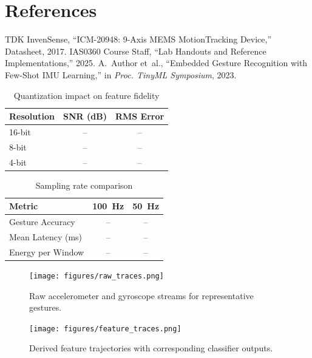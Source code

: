 \documentclass[conference]{IEEEtran}
\begin{document}
\section*{References}
\begin{thebibliography}{1}
 TDK InvenSense, ``ICM-20948: 9-Axis MEMS MotionTracking Device,'' Datasheet, 2017.
 IAS0360 Course Staff, ``Lab Handouts and Reference Implementations,'' 2025.
 A.~Author et~al., ``Embedded Gesture Recognition with Few-Shot IMU Learning,'' in \emph{Proc. TinyML Symposium}, 2023.
\end{thebibliography}

\begin{table}[!t]
    \centering
    \caption{Quantization impact on feature fidelity}
    \label{tab:quantization}
    \begin{tabular}{@{}lcc@{}}
        \toprule
        Resolution & SNR (dB) & RMS Error \\
        \midrule
        16-bit & -- & -- \\
        8-bit & -- & -- \\
        4-bit & -- & -- \\
        \bottomrule
    \end{tabular}
\end{table}

\begin{table}[!t]
    \centering
    \caption{Sampling rate comparison}
    \label{tab:sampling}
    \begin{tabular}{@{}lcc@{}}
        \toprule
        Metric & \SI{100}{\hertz} & \SI{50}{\hertz} \\
        \midrule
        Gesture Accuracy & -- & -- \\
        Mean Latency (ms) & -- & -- \\
        Energy per Window & -- & -- \\
        \bottomrule
    \end{tabular}
\end{table}

\begin{figure}[!t]
    \centering
    \texttt{[image: figures/raw\_traces.png]}
    \caption{Raw accelerometer and gyroscope streams for representative gestures.}
    \label{fig:raw_traces}
\end{figure}

\begin{figure}[!t]
    \centering
    \texttt{[image: figures/feature\_traces.png]}
    \caption{Derived feature trajectories with corresponding classifier outputs.}
    \label{fig:feature_traces}
\end{figure}
\end{document}
